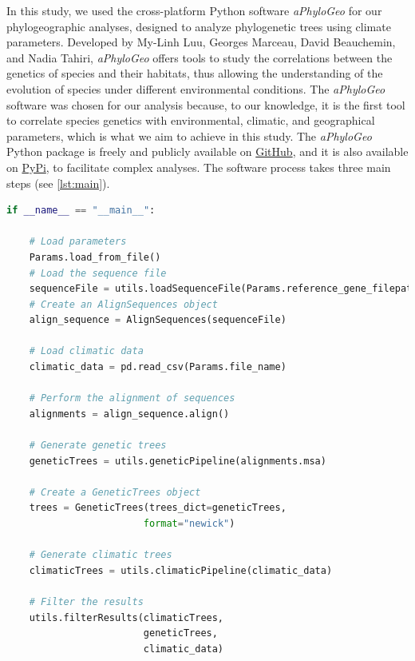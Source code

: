 In this study, we used the cross-platform Python software \textit{aPhyloGeo} for our phylogeographic analyses, designed to analyze phylogenetic trees using climate parameters. Developed by My-Linh Luu, Georges Marceau, David Beauchemin, and Nadia Tahiri, \textit{aPhyloGeo} offers tools to study the correlations between the genetics of species and their habitats, thus allowing the understanding of the evolution of species under different environmental conditions. The \textit{aPhyloGeo} software was chosen for our analysis because, to our knowledge, it is the first tool to correlate species genetics with environmental, climatic, and geographical parameters, which is what we aim to achieve in this study. The \textit{aPhyloGeo} Python package is freely and publicly available on \href{https://github.com/tahiri-lab/aPhyloGeo}{GitHub}, and it is also available on \href{https://pypi.org/project/aphylogeo/}{PyPi}, to facilitate complex analyses. The software process takes three main steps (see \autoref{lst:main}).

\begin{lstlisting}[label=lst:main,language=Python,caption=Main script for tutorial using the aPhyloGeo package.]
if __name__ == "__main__":

    # Load parameters
    Params.load_from_file()
    # Load the sequence file
    sequenceFile = utils.loadSequenceFile(Params.reference_gene_filepath)
    # Create an AlignSequences object
    align_sequence = AlignSequences(sequenceFile)

    # Load climatic data 
    climatic_data = pd.read_csv(Params.file_name)

    # Perform the alignment of sequences
    alignments = align_sequence.align()

    # Generate genetic trees
    geneticTrees = utils.geneticPipeline(alignments.msa)
    
    # Create a GeneticTrees object
    trees = GeneticTrees(trees_dict=geneticTrees, 
                        format="newick")
   
    # Generate climatic trees
    climaticTrees = utils.climaticPipeline(climatic_data)
    
    # Filter the results
    utils.filterResults(climaticTrees, 
                        geneticTrees, 
                        climatic_data)

\end{lstlisting}

